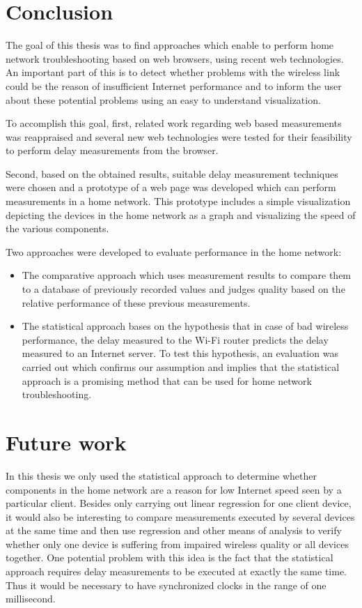 \documentclass{sig-alternate-10pt}
\begin{document}
\section{Conclusion}

The goal of this thesis was to find approaches which enable to perform home network troubleshooting based on web browsers, using recent web technologies. An important part of this is to detect whether problems with the wireless link could be the reason of insufficient Internet performance and to inform the user about these potential problems using an easy to understand visualization. 

To accomplish this goal, first, related work regarding web based measurements was reappraised and several new web technologies were tested for their feasibility to perform delay measurements from the browser. 

Second, based on the obtained results, suitable delay measurement techniques were chosen and a prototype of a web page was developed which can perform measurements in a home network. This prototype includes a simple visualization depicting the devices in the home network as a graph and visualizing the speed of the various components. 

Two approaches were developed to evaluate performance in the home network:
\begin{itemize}
\item The comparative approach which uses measurement results to compare them to a database of previously recorded values and judges quality based on the relative performance of these previous measurements. 
\item The statistical approach bases on the hypothesis that in case of bad wireless performance, the delay measured to the Wi-Fi router predicts the delay measured to an Internet server. To test this hypothesis, an evaluation was carried out which confirms our assumption and implies that the statistical approach is a promising method that can be used for home network troubleshooting. 
\end{itemize}

\section{Future work}

In this thesis we only used the statistical approach to determine whether components in the home network are a reason for low Internet speed seen by a particular client. Besides only carrying out linear regression for one client device, it would also be interesting to compare measurements executed by several devices at the same time and then use regression and other means of analysis to verify whether only one device is suffering from impaired wireless quality or all devices together. One potential problem with this idea is the fact that the statistical approach requires delay measurements to be executed at exactly the same time. Thus it would be necessary to have synchronized clocks in the range of one millisecond.
\end{document}
